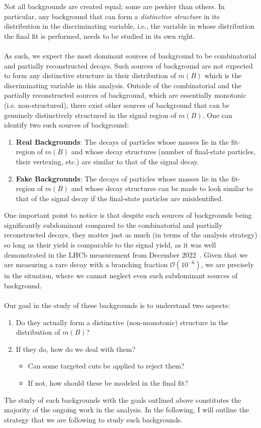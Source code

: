 Not all backgrounds are created equal; some are peskier than others. %
In particular, any background that can form a \emph{distinctive structure} in its distribution in the discriminating variable, i.e., the variable in whose distribution the final fit is performed, needs to be studied in its own right. %
\\\\
As such, we expect the most dominant sources of background to be combinatorial and partially reconstructed decays. %
Such sources of background are not expected to form any distinctive structure in their distribution of $m(B)$ which is the discriminating variable in this analysis. %
Outside of the combinatorial and the partially reconstructed sources of background, which are essentially monotonic (i.e. non-structured), there exist other sources of background that can be genuinely distinctively structured in the signal region of $m(B)$. %
One can identify two such sources of background:
\begin{enumerate}
    \item \textbf{Real Backgrounds}: The decays of particles whose masses lie in the fit-region of $m(B)$ and whose decay structures (number of final-state particles, their vertexing, etc.) are similar to that of the signal decay. 
    \item \textbf{Fake Backgrounds}: The decays of particles whose masses lie in the fit-region of $m(B)$ and whose decay structures can be made to look similar to that of the signal decay if the final-state particles are misidentified.
\end{enumerate} 
One important point to notice is that despite such sources of backgrounds being significantly subdominant compared to the combinatorial and partially reconstructed decays, they matter just as much (in terms of the analysis strategy) so long as their yield is comparable to the signal yield, as it was well demonstrated in the LHCb measurement from December 2022~\cite{LHCbDec2022}. %
Given that we are measuring a rare decay with a branching fraction $\mathcal{O}(10^{-6})$, we are precisely in the situation, where we cannot neglect even such subdominant sources of background. %
\\\\
Our goal in the study of these backgrounds is to understand two aspects:
\begin{enumerate}
    \item Do they actually form a distinctive (non-monotonic) structure in the distribution of $m(B)$? 
    \item If they do, how do we deal with them?
    \begin{itemize}
        \item Can some targeted cuts be applied to reject them?
        \item If not, how should these be modeled in the final fit?
    \end{itemize}
\end{enumerate}
The study of such backgrounds with the goals outlined above constitutes the majority of the ongoing work in the analysis. %
In the following, I will outline the strategy that we are following to study such backgrounds.

